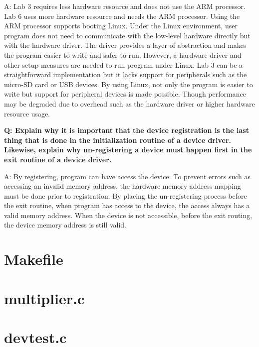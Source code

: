 \documentclass[11pt,letterpaper,titlepage]{article}
\begin{document}
A: Lab 3 requires less hardware resource and does not use the ARM processor. Lab 6 uses more hardware resource and needs the ARM processor. Using the ARM processor supports booting Linux. Under the Linux environment, user program does not need to communicate with the low-level hardware directly but with the hardware driver. The driver provides a layer of abstraction and makes the program easier to write and safer to run. However, a hardware driver and other setup measures are needed to run program under Linux. Lab 3 can be a straightforward implementation but it lacks support for peripherals such as the micro-SD card or USB devices. By using Linux, not only the program is easier to write but support for peripheral devices is made possible. Though performance may be degraded due to overhead such as the hardware driver or higher hardware resource usage.

\textbf{Q: Explain why it is important that the device registration is the last thing that is done in the initialization routine of a device driver. Likewise, explain why un-registering a device must happen first in the exit routine of a device driver.}

A: By registering, program can have access the device. To prevent errors such as accessing an invalid memory address, the hardware memory address mapping must be done prior to registration. By placing the un-registering process before the exit routine, when program has access to the device, the access always has a valid memory address. When the device is not accessible, before the exit routing, the device memory address is still valid.

\newpage

\begin{appendices}

\section{Makefile}
\label{appendix:makefile}


\section{multiplier.c}
\label{appendix:sourcecode_multiplier}


\section{devtest.c}
\label{appendix:sourcecode_devtest}


\end{appendices}
\end{document}
